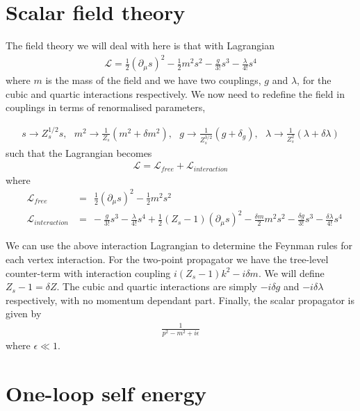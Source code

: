 \documentclass[11pt]{article}
\begin{document}
\section{Scalar field theory}

The field theory we will deal with here is that with Lagrangian
\begin{align}
\mathcal{L} = \frac{1}{2}(\partial_{\mu} s)^2-\frac{1}{2}m^2s^2-\frac{g}{3!}s^3-\frac{\lambda}{4!}s^4
\end{align}
where $m$ is the mass of the field and we have two couplings, $g$ and $\lambda$, for the cubic and quartic interactions respectively.  We now need to redefine the field in couplings in terms of renormalised parameters,

\begin{align}
s\rightarrow Z^{1/2}_ss, \ \ \ m^2\rightarrow\frac{1}{Z_s}(m^2+\delta m^2),  \ \ \ g\rightarrow \frac{1}{Z_s^{3/2}}(g+\delta_g), \ \ \ \lambda\rightarrow \frac{1}{Z_s^2}(\lambda+\delta\lambda)
\end{align}
such that the Lagrangian becomes
\begin{align}
\mathcal{L} = \mathcal{L}_{free}+\mathcal{L}_{interaction}
\end{align}
where
\begin{eqnarray}
&\mathcal{L}_{free} &=  \ \ \frac{1}{2}(\partial_{\mu} s)^2-\frac{1}{2}m^2s^2\\
&\mathcal{L}_{interaction} &= \ -\frac{g}{3!}s^3-\frac{\lambda}{4!}s^4  +\frac{1}{2}(Z_s-1)(\partial_{\mu} s)^2 -\frac{\delta m}{2}m^2s^2-\frac{\delta g}{3!}s^3-\frac{\delta \lambda}{4!}s^4
\end{eqnarray}

We can use the above interaction Lagrangian to determine the Feynman rules for each vertex interaction.  For the two-point propagator we have the tree-level counter-term with interaction coupling $i(Z_s-1)k^2-i\delta m$.  We will define $Z_s-1=\delta Z$.  The cubic and quartic interactions are simply $-i\delta g$ and $-i\delta \lambda$ respectively, with no momentum dependant part.  Finally, the scalar propagator is given by
\begin{align}
\frac{1}{p^2-m^2+i\epsilon}
\end{align}
where $\epsilon\ll 1$.





\section{One-loop self energy}
\end{document}
